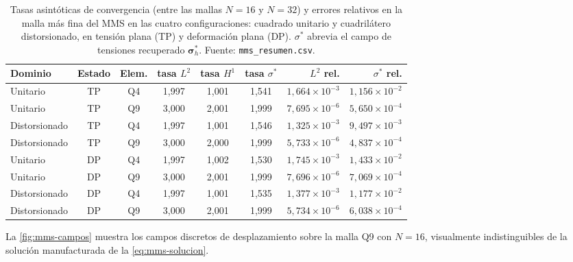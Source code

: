 \begin{table}[htbp]
\centering
\caption[Tasas asintóticas del MMS en las cuatro configuraciones.]{Tasas asintóticas de convergencia (entre las mallas $N=16$ y $N=32$) y errores relativos en la malla más fina del MMS en las cuatro configuraciones: cuadrado unitario y cuadrilátero distorsionado, en tensión plana (TP) y deformación plana (DP). $\sigma^*$ abrevia el campo de tensiones recuperado $\bm{\sigma}^*_h$. Fuente: \texttt{mms\_resumen.csv}.}
\label{tab:mms-configs}
\small
\setlength{\tabcolsep}{4pt}
\begin{tabular}{l c c c c c r r}
\hline
Dominio & Estado & Elem. & tasa $L^2$ & tasa $H^1$ & tasa $\sigma^*$ & $L^2$ rel. & $\sigma^*$ rel. \\
\hline
Unitario      & TP & Q4 & 1,997 & 1,001 & 1,541 & $1{,}664\times10^{-3}$ & $1{,}156\times10^{-2}$ \\
Unitario      & TP & Q9 & 3,000 & 2,001 & 1,999 & $7{,}695\times10^{-6}$ & $5{,}650\times10^{-4}$ \\
Distorsionado & TP & Q4 & 1,997 & 1,001 & 1,546 & $1{,}325\times10^{-3}$ & $9{,}497\times10^{-3}$ \\
Distorsionado & TP & Q9 & 3,000 & 2,000 & 1,999 & $5{,}733\times10^{-6}$ & $4{,}837\times10^{-4}$ \\
Unitario      & DP & Q4 & 1,997 & 1,002 & 1,530 & $1{,}745\times10^{-3}$ & $1{,}433\times10^{-2}$ \\
Unitario      & DP & Q9 & 3,000 & 2,001 & 1,999 & $7{,}696\times10^{-6}$ & $7{,}069\times10^{-4}$ \\
Distorsionado & DP & Q4 & 1,997 & 1,001 & 1,535 & $1{,}377\times10^{-3}$ & $1{,}177\times10^{-2}$ \\
Distorsionado & DP & Q9 & 3,000 & 2,001 & 1,999 & $5{,}734\times10^{-6}$ & $6{,}038\times10^{-4}$ \\
\hline
\end{tabular}
\end{table}

La \autoref{fig:mms-campos} muestra los campos discretos de desplazamiento sobre la malla Q9 con $N=16$, visualmente indistinguibles de la solución manufacturada de la \autoref{eq:mms-solucion}.

